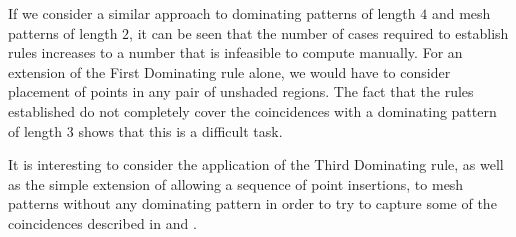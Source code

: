 If we consider a similar approach to dominating patterns of length \(4\) and
mesh patterns of length \(2\), it can be seen that the number of cases required
to establish rules increases to a number that is infeasible to compute manually.
For an extension of the First Dominating rule alone, we would have to consider
placement of points in any pair of unshaded regions. The fact that the rules
established do not completely cover the coincidences with a dominating pattern
of length \(3\) shows that this is a difficult task.

It is interesting to consider the application of the Third Dominating rule, as well as the simple
extension of allowing a sequence of point insertions, to mesh patterns without any dominating
pattern in order to try to capture some of the coincidences described in
\textcite{DBLP:journals/combinatorics/HilmarssonJSVU15} and
\textcite{DBLP:journals/corr/ClaessonTU14}.
